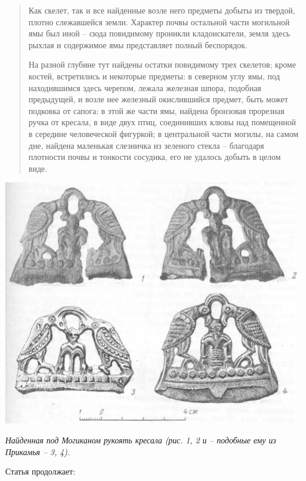 \begin{quotation}
Как скелет, так и все найденные возле него предметы добыты из твердой, плотно слежавшейся земли. Характер почвы остальной части могильной ямы был иной – сюда повидимому проникли кладоискатели, земля здесь рыхлая и содержимое ямы представляет полный беспорядок.

На разной глубине тут найдены остатки повидимому трех скелетов; кроме костей, встретились и некоторые предметы: в северном углу ямы, под находившимся здесь черепом, лежала железная шпора, подобная предыдущей, и возле нее железный окислившийся предмет, быть может подковка от сапога; в этой же части ямы, найдена бронзовая прорезная ручка от кресала, в виде двух птиц, соединивших клювы над помещенной в середине человеческой фигуркой; в центральной части могилы, на самом дне, найдена маленькая слезничка из зеленого стекла – благодаря плотности почвы и тонкости сосудика, его не удалось добыть в целом виде.
\end{quotation}
\vspace*{\fill}
\begin{center}
\includegraphics[width=\linewidth]{chast-kirvys/lys02/1899-mogikan-kresalo.jpg}

\textit{Найденная под Могиканом рукоять кресала (рис. 1, 2 и – подобные ему из Прикамья – 3, 4).}
\end{center} 
\vspace*{\fill}
\newpage

Статья продолжает:


